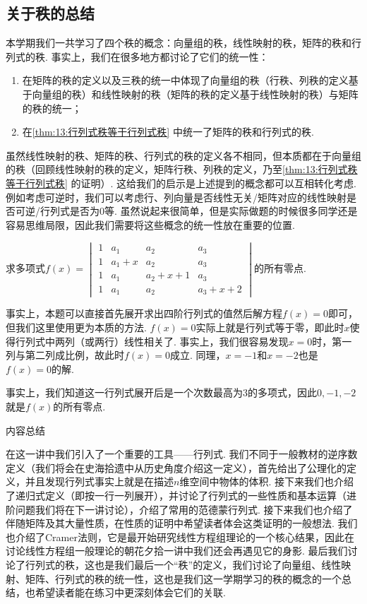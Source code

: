 \subsection{关于秩的总结}

本学期我们一共学习了四个秩的概念：向量组的秩，线性映射的秩，矩阵的秩和行列式的秩. 事实上，我们在很多地方都讨论了它们的统一性：
\begin{enumerate}
    \item 在矩阵的秩的定义以及三秩的统一中体现了向量组的秩（行秩、列秩的定义基于向量组的秩）和线性映射的秩（矩阵的秩的定义基于线性映射的秩）与矩阵的秩的统一；

    \item 在\autoref{thm:13:行列式秩等于行列式秩} 中统一了矩阵的秩和行列式的秩.
\end{enumerate}
虽然线性映射的秩、矩阵的秩、行列式的秩的定义各不相同，但本质都在于向量组的秩（回顾线性映射的秩的定义，矩阵行秩、列秩的定义，乃至\autoref*{thm:13:行列式秩等于行列式秩} 的证明）. 这给我们的启示是上述提到的概念都可以互相转化考虑. 例如考虑可逆时，我们可以考虑行、列向量是否线性无关/矩阵对应的线性映射是否可逆/行列式是否为0等. 虽然说起来很简单，但是实际做题的时候很多同学还是容易思维局限，因此我们需要将这些概念的统一性放在重要的位置.
\begin{example}
    求多项式$f(x)=\begin{vmatrix}
            1 & a_1   & a_2     & a_3     \\
            1 & a_1+x & a_2     & a_3     \\
            1 & a_1   & a_2+x+1 & a_3     \\
            1 & a_1   & a_2     & a_3+x+2
        \end{vmatrix}$的所有零点.
\end{example}

\begin{solution}
    事实上，本题可以直接首先展开求出四阶行列式的值然后解方程$f(x)=0$即可，但我们这里使用更为本质的方法. $f(x)=0$实际上就是行列式等于零，即此时$x$使得行列式中两列（或两行）线性相关了. 事实上，我们很容易发现$x=0$时，第一列与第二列成比例，故此时$f(x)=0$成立. 同理，$x=-1$和$x=-2$也是$f(x)=0$的解.

    事实上，我们知道这一行列式展开后是一个次数最高为3的多项式，因此$0,-1,-2$就是$f(x)$的所有零点.
\end{solution}

\vspace{2ex}
\centerline{\heiti \Large 内容总结}

在这一讲中我们引入了一个重要的工具——行列式. 我们不同于一般教材的逆序数定义（我们将会在史海拾遗中从历史角度介绍这一定义），首先给出了公理化的定义，并且发现行列式事实上就是在描述$n$维空间中物体的体积. 接下来我们也介绍了递归式定义（即按一行一列展开），并讨论了行列式的一些性质和基本运算（进阶问题我们将在下一讲讨论），介绍了常用的范德蒙行列式. 接下来我们也介绍了伴随矩阵及其大量性质，在性质的证明中希望读者体会这类证明的一般想法. 我们也介绍了Cramer法则，它是最开始研究线性方程组理论的一个核心结果，因此在讨论线性方程组一般理论的朝花夕拾一讲中我们还会再遇见它的身影. 最后我们讨论了行列式的秩，这也是我们最后一个``秩''的定义，我们讨论了向量组、线性映射、矩阵、行列式的秩的统一性，这也是我们这一学期学习的秩的概念的一个总结，也希望读者能在练习中更深刻体会它们的关联.

